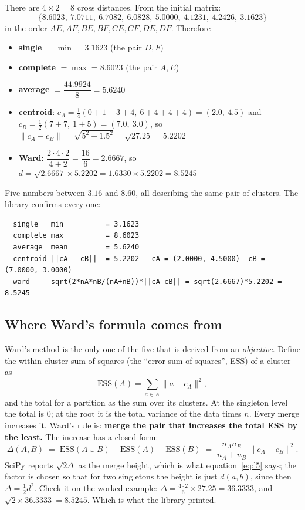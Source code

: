 \documentclass[11pt]{article}
\begin{document}
\begin{worked}[All five, for $A = \{A,B,C,D\}$ against $B = \{E,F\}$]
There are $4 \times 2 = 8$ cross distances. From the initial matrix:
\[
  \{8.6023,\ 7.0711,\ 6.7082,\ 6.0828,\ 5.0000,\ 4.1231,\ 4.2426,\ 3.1623\}
\]
in the order $AE, AF, BE, BF, CE, CF, DE, DF$. Therefore
\begin{itemize}[leftmargin=*]
  \item \textbf{single} $= \min = 3.1623$ \quad (the pair $D,F$)
  \item \textbf{complete} $= \max = 8.6023$ \quad (the pair $A,E$)
  \item \textbf{average} $= \dfrac{44.9924}{8} = 5.6240$
  \item \textbf{centroid}: $c_A = \frac{1}{4}(0+1+3+4,\ 6+4+4+4) = (2.0,\
    4.5)$ and $c_B = \frac{1}{2}(7+7,\ 1+5) = (7.0,\ 3.0)$, so
    $\lVert c_A - c_B\rVert = \sqrt{5^2 + 1.5^2} = \sqrt{27.25} = 5.2202$
  \item \textbf{Ward}: $\dfrac{2 \cdot 4 \cdot 2}{4+2} = \dfrac{16}{6} =
    2.6667$, so $d = \sqrt{2.6667} \times 5.2202 = 1.6330 \times 5.2202 =
    8.5245$
\end{itemize}
Five numbers between $3.16$ and $8.60$, all describing the same pair of
clusters. The library confirms every one:
\begin{lstlisting}
  single   min          = 3.1623
  complete max          = 8.6023
  average  mean         = 5.6240
  centroid ||cA - cB||  = 5.2202   cA = (2.0000, 4.5000)  cB = (7.0000, 3.0000)
  ward     sqrt(2*nA*nB/(nA+nB))*||cA-cB|| = sqrt(2.6667)*5.2202 = 8.5245
\end{lstlisting}
\end{worked}

\subsection{Where Ward's formula comes from}

Ward's method is the only one of the five that is derived from an
\emph{objective}. Define the within-cluster sum of squares (the ``error sum of
squares'', ESS) of a cluster as
\begin{equation}
  \mathrm{ESS}(A) = \sum_{a \in A} \lVert a - c_A \rVert^2 ,
  \label{eq:ess}
\end{equation}
and the total for a partition as the sum over its clusters. At the singleton
level the total is $0$; at the root it is the total variance of the data times
$n$. Every merge increases it. Ward's rule is: \textbf{merge the pair that
increases the total ESS by the least.} The increase has a closed form:
\begin{equation}
  \Delta(A,B) \;=\; \mathrm{ESS}(A \cup B) - \mathrm{ESS}(A) - \mathrm{ESS}(B)
  \;=\; \frac{n_A n_B}{n_A + n_B}\,\lVert c_A - c_B \rVert^2 .
  \label{eq:wardcost}
\end{equation}
SciPy reports $\sqrt{2\Delta}$ as the merge height, which is what
equation~\eqref{eq:l5} says; the factor is chosen so that for two singletons
the height is just $d(a,b)$, since then $\Delta = \tfrac12 d^2$. Check it on
the worked example: $\Delta = \frac{4 \cdot 2}{6}\times 27.25 = 36.3333$, and
$\sqrt{2 \times 36.3333} = 8.5245$. Which is what the library printed.
\end{document}
